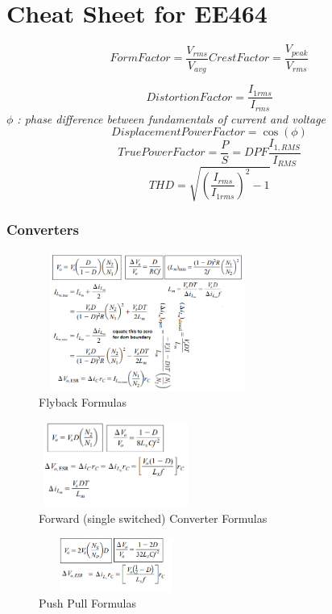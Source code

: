 \documentclass[twocolumn, ]{article}
\begin{document}
\section*{\small Cheat Sheet for EE464}
\small \begin{equation*}
Form Factor=\frac{V_{rms}}{V_{avg}}
Crest Factor=\frac{V_{peak}}{V_{rms}}
\end{equation*}

\begin{equation*}
Distortion Factor=\frac{I_{1rms}}{I_{rms}}
\end{equation*}
\textit{$\phi$ : phase difference between fundamentals of current and voltage}
\begin{equation*}
Displacement Power Factor=\cos(\phi)
\end{equation*}
\begin{equation*}
True Power Factor=\frac{P}{S}=DPF \frac{I_{1,RMS}}{I_{RMS}}
\end{equation*}
\begin{equation*}
THD=\sqrt{(\frac{I_{rms}}{I_{1rms}})^2-1}
\end{equation*}



\subsubsection*{Converters}

\begin{figure}[!ht]
	\includegraphics[width=2.8in,height=1.8in]{flybackformulasfromhart.png}
	\caption{Flyback Formulas}
\end{figure}
\begin{figure}[!ht]
	\includegraphics[width=2in,height=1.1in]{forwardsingleswitch.png}
	\caption{Forward (single switched) Converter Formulas}
\end{figure}
\begin{figure}[!ht]
	\includegraphics[width=2in,height=0.7in]{pushpull_someformulas.png}
	\caption{Push Pull Formulas}
\end{figure}
\end{document}
